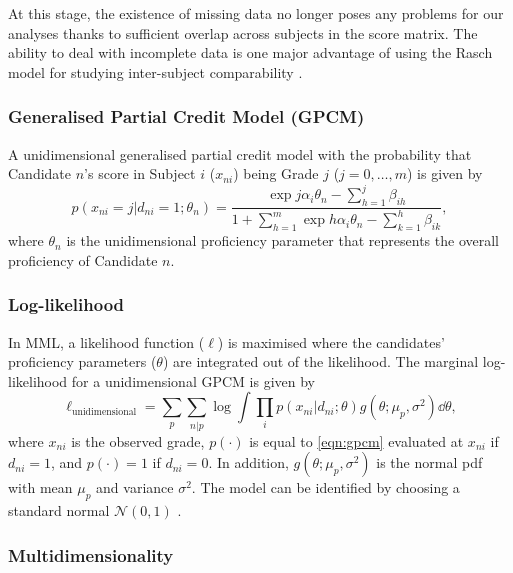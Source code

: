 At this stage, the existence of missing data no longer poses any problems for our analyses thanks to sufficient overlap across subjects in the score matrix. The ability to deal with incomplete data is one major advantage of using the Rasch model for studying inter-subject comparability \parencite{he:2018}.

\subsubsection{Generalised Partial Credit Model (GPCM)}

A unidimensional generalised partial credit model \parencite{muraki:1992} with the probability that Candidate $n$'s score in Subject $i$ ($x_{ni}$) being Grade $j$ ($j=0, \dots, m$) is given by
\begin{equation}\label{eqn:gpcm}
    p \left( x_{ni}=j | d_{ni} = 1; \theta_n \right) = \frac{\exp{j \alpha_i \theta_n - \sum_{h=1}^j \beta_{ih}} }{ 1 + \sum_{h=1}^m \exp{h \alpha_i \theta_n - \sum_{k=1}^h \beta_{ik}} },
\end{equation}
where $\theta_n$ is the unidimensional proficiency parameter that represents the overall proficiency of Candidate $n$.

\subsubsection{Log-likelihood}

In MML, a likelihood function ($\ell$) is maximised where the candidates' proficiency parameters ($\theta$) are integrated out of the likelihood. The marginal log-likelihood for a unidimensional GPCM is given by
\begin{equation}\label{eqn:ll}
    \ell_\text{unidimensional} = \sum_p \sum_{n | p} \log \int \prod_i p( x_{ni} | d_{ni}; \theta ) g(\theta; \mu_p, \sigma^2) \dd \theta,
\end{equation}
where $x_{ni}$ is the observed grade, $p( \cdot )$ is equal to \cref{eqn:gpcm} evaluated at $x_{ni}$ if $d_{ni}=1$, and $p( \cdot ) = 1$ if $d_{ni} = 0$. In addition, $g(\theta; \mu_p, \sigma^2)$ is the normal pdf with mean $\mu_p$ and variance $\sigma^2$. The model can be identified by choosing a standard normal $\mathcal{N}(0,1)$ \parencite{korobko:2008}.

\subsubsection{Multidimensionality}

